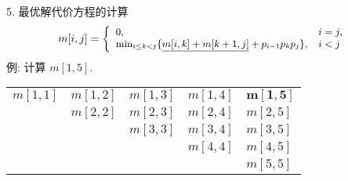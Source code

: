 \documentclass[fontset=fandol,UTF8,fleqn]{beamer}
\begin{document}
\begin{frame}{5. 最优解代价方程的计算}
\begin{eqnarray*}
\small{
  \label{eq:step2}
  m[i,j]=\left\{\begin{array}{ll}
0, & i = j,\\
\mathrm{min}_{i\leq k< j}\{\underline{m[i,k]+m[k+1,j]}+p_{i-1}p_kp_j\}, &
i<j
\end{array}\right.} 
\end{eqnarray*}
例: 计算 $m[1,5]$. 
\begin{table}
  \centering
  \begin{tabular}{lllll}
    $m[1,1]$ & $m[1,2]$ & $m[1,3]$ & $m[1,4]$ & $\mathbf{m[1,5]}$  \\
             & $m[2,2]$ & $m[2,3]$ & $m[2,4]$ & $m[2,5]$  \\
             &          & $m[3,3]$ & $m[3,4]$ & $m[3,5]$  \\   
             &          &          & $m[4,4]$ & $m[4,5]$  \\ 
             &          &          &          & $m[5,5]$    
  \end{tabular}
\end{table}
\end{frame}
%

\end{document}
